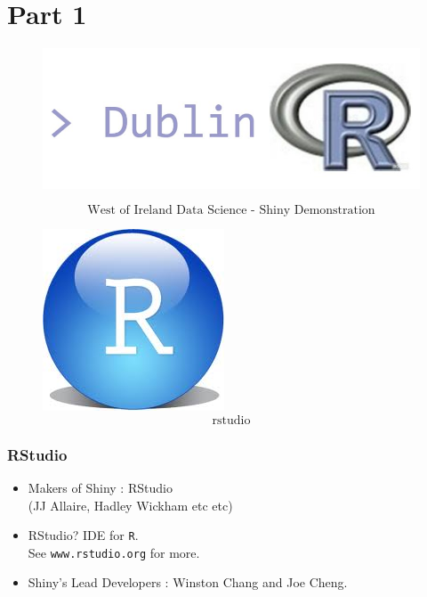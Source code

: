 \documentclass{beamer}
\begin{document}
\section{Part 1}

\begin{frame}
\begin{figure}
\vspace{1cm}
\centering
\includegraphics[width=0.99\linewidth]{./RlogoMAM}

\end{figure}
\LARGE
\[ \mbox{West of Ireland Data Science - Shiny Demonstration}  \]
\Large

\end{frame}
\begin{frame}
\begin{figure}
\Large
\centering
\includegraphics[width=0.55\linewidth]{./Rstudio}
\[ \mbox{rstudio}  \]
\end{figure}

\end{frame}
\begin{frame}
\frametitle{RStudio}
\LARGE
\begin{itemize}
\item Makers of Shiny : RStudio\\ (JJ Allaire, Hadley Wickham etc etc) \bigskip
\item RStudio? IDE for \texttt{R}. \\ See \texttt{www.rstudio.org} for more.\bigskip
\item Shiny's  Lead Developers : Winston Chang and Joe Cheng.
\end{itemize}

\end{frame}
\end{document}
